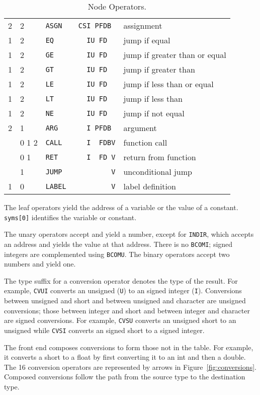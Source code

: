 \begin{table}
\begin{center}
\begin{tabular}{lllll}
 2	& 2	& \tt ASGN	& \verb|CSI PFDB |	& assignment \\
 1	& 2	& \tt EQ	& \verb|  IU FD  |	& jump if equal \\
 1	& 2	& \tt GE	& \verb|  IU FD  |	& jump if greater than or equal \\
 1	& 2	& \tt GT	& \verb|  IU FD  |	& jump if greater than \\
 1	& 2	& \tt LE	& \verb|  IU FD  |	& jump if less than or equal \\
 1	& 2	& \tt LT	& \verb|  IU FD  |	& jump if less than \\
 1	& 2	& \tt NE	& \verb|  IU FD  |	& jump if not equal \\[1.5ex]

 2	& 1	& \tt ARG	& \verb|  I PFDB |	& argument \\
	& 0 1 2	& \tt CALL	& \verb|  I  FDBV|	& function call \\
	& 0 1	& \tt RET	& \verb|  I  FD V|	& return from function \\[1.5ex]

  	& 1	& \tt JUMP	& \verb|        V|	& unconditional jump \\
 1	& 0	& \tt LABEL	& \verb|        V|	& label definition \\
\end{tabular}
\end{center}
\caption{Node Operators.\label{dags:op-table}}
\end{table}

The leaf operators yield the address of a variable or the value of a
constant. \verb|syms[0]| identifies the variable or constant.

The unary operators accept and yield a number, except for \verb|INDIR|,
which accepts an address and yields the value at that address.
There is no \verb|BCOMI|; signed integers are complemented using
\verb|BCOMU|. The binary operators accept two numbers and yield one.

The type suffix for a conversion operator denotes the type of the
result.  For example, \verb|CVUI| converts an unsigned (\verb|U|) to an
signed integer (\verb|I|).  Conversions between unsigned and short and
between unsigned and character are unsigned conversions; those between
integer and short and between integer and character are signed
conversions.  For example, \verb|CVSU| converts an unsigned short to an
unsigned while \verb|CVSI| converts an signed short to a signed
integer.

The front end composes conversions to form those not in the table.
For example, it converts a short to a float by first
converting it to an int and then a double.  The 16
conversion operators are represented by arrows in Figure~\ref{fig:conversions}.
Composed conversions follow the path from the source
type to the destination type.

